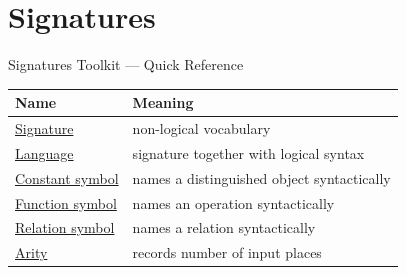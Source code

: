 \section{Signatures}

\begin{toolkitbox}{Signatures Toolkit --- Quick Reference}
\small
\begin{tabular}{l l}
\toprule
\textbf{Name}  & \textbf{Meaning} \\
\midrule
\hyperref[def:signature]{Signature}  & non-logical vocabulary \\
\hyperref[def:language]{Language}  & signature together with logical syntax \\
\hyperref[def:signature-constant-symbol]{Constant symbol}  & names a distinguished object syntactically \\
\hyperref[def:signature-function-symbol]{Function symbol}  & names an operation syntactically \\
\hyperref[def:relation-symbol]{Relation symbol}  & names a relation syntactically \\
\hyperref[def:arity]{Arity}  & records number of input places \\
\bottomrule
\end{tabular}
\end{toolkitbox}


